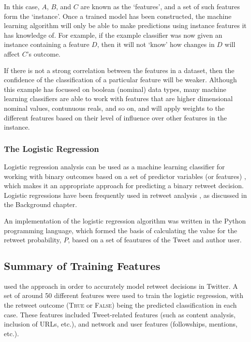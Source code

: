 In this case, $A$, $B$, and $C$ are known as the `features', and a set of such features form the `instance'. Once a trained model has been constructed, the machine learning algorithm will only be able to make predictions using instance features it has knowledge of. For example, if the example classifier was now given an instance containing a feature $D$, then it will not `know' how changes in $D$ will affect $C$'s outcome.

If there is not a strong correlation between the features in a dataset, then the confidence of the classification of a particular feature will be weaker. Although this example has focussed on boolean (nominal) data types, many machine learning classifiers are able to work with features that are higher dimensional nominal values, contunuous reals, and so on, and will apply weights to the different features based on their level of influence over other features in the instance.


\subsubsection{The Logistic Regression}
Logistic regression analysis can be used as a machine learning classifier for working with binary outcomes based on a set of predictor variables (or features) \cite{hosmer13}, which makes it an appropriate approach for predicting a binary retweet decision. Logistic regressions have been frequently used in retweet analysis \cite{castillo11} \cite{zhu11} \cite{peng11} \cite{naveed11} \cite{hong11}, as discussed in the Background chapter.

An implementation of the logistic regression algorithm was written in the Python programming language, which formed the basis of calculating the value for the retweet probability, $P$, based on a set of feautures of the Tweet and author user.


\subsection{Summary of Training Features}
\cite{zhu11} used the approach in order to accurately model retweet decisions in Twitter. A set of around 50 different features were used to train the logistic regression, with the retweet outcome (\textsc{True} or \textsc{False}) being the predicted classification in each case. These features included Tweet-related features (such as content analysis, inclusion of URLs, etc.), and network and user features (followships, mentions, etc.).

